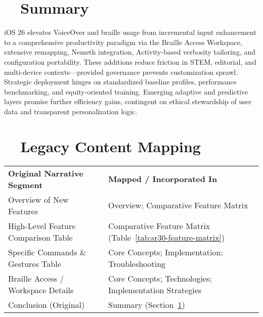 \section{~~Summary}
\label{sec:sr30-summary}
iOS 26 elevates VoiceOver and braille usage from incremental input enhancement to a comprehensive productivity paradigm via the Braille Access Workspace, extensive remapping, Nemeth integration, Activity-based verbosity tailoring, and configuration portability. These additions reduce friction in STEM, editorial, and multi-device contexts—provided governance prevents customization sprawl. Strategic deployment hinges on standardized baseline profiles, performance benchmarking, and equity-oriented training. Emerging adaptive and predictive layers promise further efficiency gains, contingent on ethical stewardship of user data and transparent personalization logic.

\section{~~Legacy Content Mapping}
\label{sec:sr30-legacy-mapping}
\begin{tabular}{p{} p{}}
	\textbf{Original Narrative Segment} & \textbf{Mapped / Incorporated In}                                \\
	Overview of New Features            & Overview; Comparative Feature Matrix                             \\
	High-Level Feature Comparison Table & Comparative Feature Matrix (Table~\ref{tab:sr30-feature-matrix}) \\
	Specific Commands \& Gestures Table & Core Concepts; Implementation; Troubleshooting                   \\
	Braille Access / Workspace Details  & Core Concepts; Technologies; Implementation Strategies           \\
	Conclusion (Original)               & Summary (Section~\ref{sec:sr30-summary})                         \\
\end{tabular}

